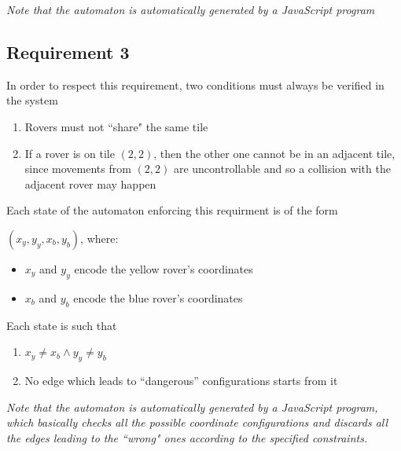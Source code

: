 \documentclass{article}
\begin{document}
\textit{Note that the automaton is automatically generated by a JavaScript program}

\subsection{Requirement 3}
In order to respect this requirement, two conditions must always be verified in the system
\begin{enumerate}
    \item Rovers must not ``share" the same tile
    \item If a rover is on tile $(2,2)$, then the other one cannot be in an adjacent tile,
          since movements from $(2,2)$ are uncontrollable and so a collision with the adjacent rover may happen
\end{enumerate}
Each state of the automaton enforcing this requirment is of the form

$(x_{y}, y_{y}, x_{b}, y_{b})$, where:
\begin{itemize}
    \item $x_{y}$ and $y_{y}$ encode the yellow rover's coordinates
    \item $x_{b}$ and $y_{b}$ encode the blue rover's coordinates
\end{itemize}

\newpage

Each state is such that
\begin{enumerate}
    \item $x_{y} \neq x_{b} \land y_{y} \neq y_{b}$
    \item No edge which leads to ``dangerous'' configurations starts from it
\end{enumerate}

\textit{Note that the automaton is automatically generated by a JavaScript program,
    which basically checks all the possible coordinate configurations
    and discards all the edges leading to the ``wrong" ones according to the specified constraints.
}
\end{document}
